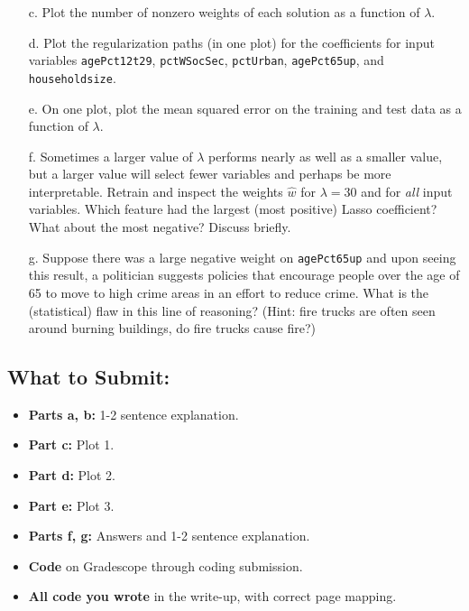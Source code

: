 \documentclass{article}
\begin{document}
\begin{sloppypar}
\begin{aprob}
    
    \begin{enumerate}
        \item[c.]  Plot the number of nonzero weights of each solution as a function of $\lambda$.
        \item[d.]  Plot the regularization paths (in one plot) for the coefficients for input variables \texttt{agePct12t29}, \texttt{pctWSocSec}, \texttt{pctUrban}, \texttt{agePct65up}, and \texttt{householdsize}.
        \item[e.]  On one plot, plot the mean squared error on the training and test data as a function of $\lambda$.
        \item[f.]  Sometimes a larger value of $\lambda$ performs nearly as well as a smaller value, but a larger value will select fewer variables and perhaps be more interpretable.  Retrain and inspect the weights $\hat{w}$ for $\lambda = 30$ and for \textit{all} input variables.  Which feature had the largest (most positive) Lasso coefficient? What about the most negative? Discuss briefly.
        \item[g.]  Suppose there was a large negative weight on \texttt{agePct65up} and upon seeing this result, a politician suggests policies that encourage people over the age of 65 to move to high crime areas in an effort to reduce crime. What is the (statistical) flaw in this line of reasoning? (Hint: fire trucks
        are often seen around burning buildings, do fire trucks cause fire?)
    \end{enumerate}  

    \subsection*{What to Submit:}
    \begin{itemize}
        \item \textbf{Parts a, b:} 1-2 sentence explanation.
        \item \textbf{Part c:} Plot 1.
        \item \textbf{Part d:} Plot 2.
        \item \textbf{Part e:} Plot 3.
        \item \textbf{Parts f, g:} Answers and 1-2 sentence explanation.
        \item \textbf{Code} on Gradescope through coding submission.
        \item \textbf{All code you wrote} in the write-up, with correct page mapping.
    \end{itemize}

\end{aprob}
\end{sloppypar}
\end{document}
